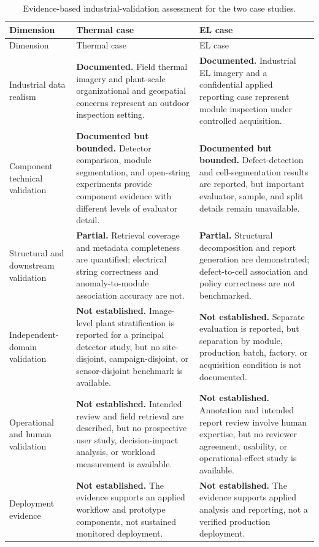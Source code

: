 \documentclass[12pt,a4paper]{report}
\begin{document}
\begin{longtable}{p{3.0cm}p{4.8cm}p{4.8cm}}
\caption{Evidence-based industrial-validation assessment for the two case studies.}\label{tab:ch07-industrial-validation}\\
\toprule
Dimension & Thermal case & EL case \\
\midrule
\endfirsthead
\toprule
Dimension & Thermal case & EL case \\
\midrule
\endhead
Industrial data realism & \textbf{Documented.} Field thermal imagery and plant-scale organizational and geospatial concerns represent an outdoor inspection setting. & \textbf{Documented.} Industrial EL imagery and a confidential applied reporting case represent module inspection under controlled acquisition. \\
Component technical validation & \textbf{Documented but bounded.} Detector comparison, module segmentation, and open-string experiments provide component evidence with different levels of evaluator detail. & \textbf{Documented but bounded.} Defect-detection and cell-segmentation results are reported, but important evaluator, sample, and split details remain unavailable. \\
Structural and downstream validation & \textbf{Partial.} Retrieval coverage and metadata completeness are quantified; electrical string correctness and anomaly-to-module association accuracy are not. & \textbf{Partial.} Structural decomposition and report generation are demonstrated; defect-to-cell association and policy correctness are not benchmarked. \\
Independent-domain validation & \textbf{Not established.} Image-level plant stratification is reported for a principal detector study, but no site-disjoint, campaign-disjoint, or sensor-disjoint benchmark is available. & \textbf{Not established.} Separate evaluation is reported, but separation by module, production batch, factory, or acquisition condition is not documented. \\
Operational and human validation & \textbf{Not established.} Intended review and field retrieval are described, but no prospective user study, decision-impact analysis, or workload measurement is available. & \textbf{Not established.} Annotation and intended report review involve human expertise, but no reviewer agreement, usability, or operational-effect study is available. \\
Deployment evidence & \textbf{Not established.} The evidence supports an applied workflow and prototype components, not sustained monitored deployment. & \textbf{Not established.} The evidence supports applied analysis and reporting, not a verified production deployment. \\
\bottomrule
\end{longtable}
\end{document}
